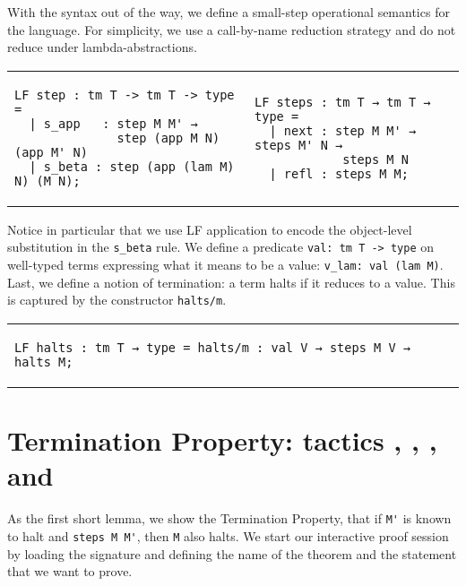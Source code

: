 
With the syntax out of the way, we define a small-step operational semantics for
the language. For simplicity, we use a call-by-name reduction
strategy and do not reduce under lambda-abstractions.
%
\begin{center}
  \begin{tabular}{ll}
\begin{lstlisting}
LF step : tm T -> tm T -> type =
  | s_app   : step M M' →
              step (app M N) (app M' N)
  | s_beta : step (app (lam M) N) (M N);
\end{lstlisting}
    &
\begin{lstlisting}
LF steps : tm T → tm T → type =
  | next : step M M' → steps M' N →
            steps M N
  | refl : steps M M;
\end{lstlisting}
  \end{tabular}
\end{center}
%
Notice in particular that we use LF application to encode the
object-level substitution in the \lstinline!s_beta! rule.
We define a predicate \lstinline!val: tm T -> type! on well-typed terms expressing what it
means to be a value: \lstinline!v_lam: val (lam M)!.
Last, we define a notion of termination: a term halts if it reduces to a value. This is captured by the constructor \lstinline!halts/m!.
\begin{center}
  \begin{tabular}{l}
\begin{lstlisting}
LF halts : tm T → type = halts/m : val V → steps M V → halts M;
\end{lstlisting}
  \end{tabular}
\end{center}

\section{%
  Termination Property: tactics \ttintros, \ttsplit, \ttunbox, and \ttsolve%
}
\label{sec:halts-step}

As the first short lemma, we show the Termination Property, that if
\lstinline!M'! is known to halt and \lstinline!steps M M'!, then \lstinline!M!
also halts.
We start our interactive proof session by loading the signature and defining the
name of the theorem and the statement that we want to prove.

